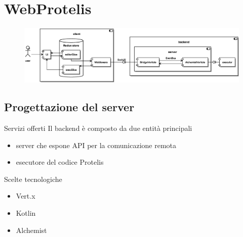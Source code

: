 \section{WebProtelis}

  \begin{frame}{\insertsectionhead}
    \begin{figure}
      \includegraphics[width=\textwidth]{res/uml/architecture-design-detail.eps}
    \end{figure}
  \end{frame}

  \subsection{Progettazione del server}

    \begin{frame}{\insertsectionhead}{\insertsubsectionhead}

      \begin{block}{Servizi offerti}
        Il backend è composto da due entità principali
        \begin{itemize}
          \item server che espone API per la comunicazione remota
          \item esecutore del codice Protelis
        \end{itemize}
      \end{block}

      \begin{block}{Scelte tecnologiche}
        \begin{itemize}
          \item Vert.x      %
          \item Kotlin      %
          \item Alchemist   %
        \end{itemize}
      \end{block}
    \end{frame}

